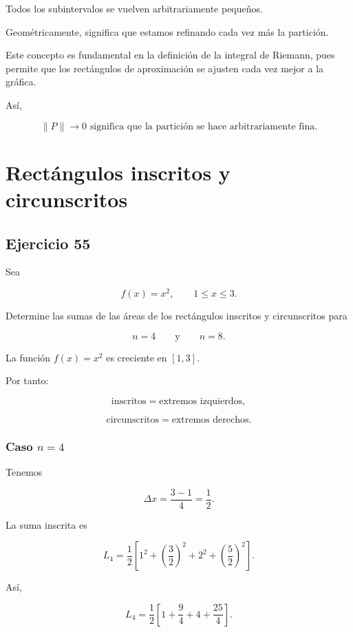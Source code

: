 \documentclass[12pt]{article}
\begin{document}
Todos los subintervalos se vuelven arbitrariamente pequeños.

Geométricamente, significa que estamos refinando cada vez más la
partición.

Este concepto es fundamental en la definición de la integral de
Riemann, pues permite que los rectángulos de aproximación se ajusten cada
vez mejor a la gráfica.

Así,

\[
\boxed{
\|P\|\to0
\text{ significa que la partición se hace arbitrariamente fina}
}.
\]

\section*{Rectángulos inscritos y circunscritos}

\subsection*{Ejercicio 55}

Sea

\[
f(x)=x^2,
\qquad
1\leq x\leq3.
\]

Determine las sumas de las áreas de los rectángulos inscritos y
circunscritos para

\[
n=4
\qquad\text{y}\qquad
n=8.
\]

La función \(f(x)=x^2\) es creciente en \([1,3]\).

Por tanto:

\[
\text{inscritos}=\text{extremos izquierdos},
\]

\[
\text{circunscritos}=\text{extremos derechos}.
\]

\subsubsection*{Caso \(n=4\)}

Tenemos

\[
\Delta x
=
\frac{3-1}{4}
=
\frac12.
\]

La suma inscrita es

\[
L_4
=
\frac12
\left[
1^2+
\left(\frac32\right)^2+
2^2+
\left(\frac52\right)^2
\right].
\]

Así,

\[
L_4
=
\frac12
\left[
1+\frac94+4+\frac{25}{4}
\right].
\]
\end{document}
